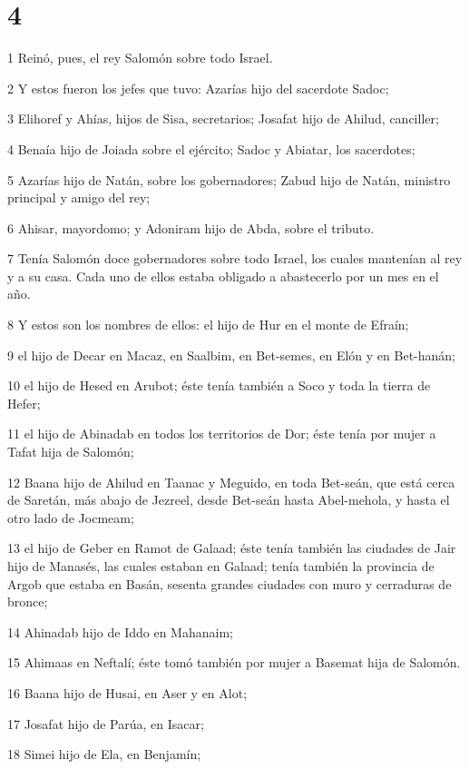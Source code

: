 \chapter{4}

\par 1 Reinó, pues, el rey Salomón sobre todo Israel.
\par 2 Y estos fueron los jefes que tuvo: Azarías hijo del sacerdote Sadoc;
\par 3 Elihoref y Ahías, hijos de Sisa, secretarios; Josafat hijo de Ahilud, canciller;
\par 4 Benaía hijo de Joiada sobre el ejército; Sadoc y Abiatar, los sacerdotes;
\par 5 Azarías hijo de Natán, sobre los gobernadores; Zabud hijo de Natán, ministro principal y amigo del rey;
\par 6 Ahisar, mayordomo; y Adoniram hijo de Abda, sobre el tributo.
\par 7 Tenía Salomón doce gobernadores sobre todo Israel, los cuales mantenían al rey y a su casa. Cada uno de ellos estaba obligado a abastecerlo por un mes en el año. 
\par 8 Y estos son los nombres de ellos: el hijo de Hur en el monte de Efraín;
\par 9 el hijo de Decar en Macaz, en Saalbim, en Bet-semes, en Elón y en Bet-hanán;
\par 10 el hijo de Hesed en Arubot; éste tenía también a Soco y toda la tierra de Hefer;
\par 11 el hijo de Abinadab en todos los territorios de Dor; éste tenía por mujer a Tafat hija de Salomón;
\par 12 Baana hijo de Ahilud en Taanac y Meguido, en toda Bet-seán, que está cerca de Saretán, más abajo de Jezreel, desde Bet-seán hasta Abel-mehola, y hasta el otro lado de Jocmeam;
\par 13 el hijo de Geber en Ramot de Galaad; éste tenía también las ciudades de Jair hijo de Manasés, las cuales estaban en Galaad; tenía también la provincia de Argob que estaba en Basán, sesenta grandes ciudades con muro y cerraduras de bronce;
\par 14 Ahinadab hijo de Iddo en Mahanaim;
\par 15 Ahimaas en Neftalí; éste tomó también por mujer a Basemat hija de Salomón.
\par 16 Baana hijo de Husai, en Aser y en Alot;
\par 17 Josafat hijo de Parúa, en Isacar;
\par 18 Simei hijo de Ela, en Benjamín;
